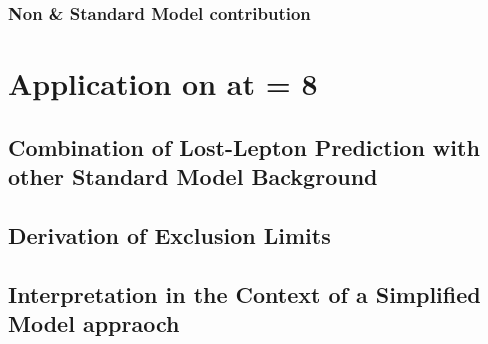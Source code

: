 \subsection{Non \ttbar \& \wpj Standard Model contribution}
\label{sec:Lost_Lepton_8TeV_Systematics_other_sm}


\chapter{Application on \lumi at \CM = 8 \tev}
\section{Combination of Lost-Lepton Prediction with other Standard Model Background}
\section{Derivation of Exclusion Limits}
\label{sec:Lost_Lepton_8TeV_RA2_Limits}
\section{Interpretation in the Context of a Simplified Model appraoch}
\label{sec:Lost_Lepton_8TeV_RA2_SMS}
